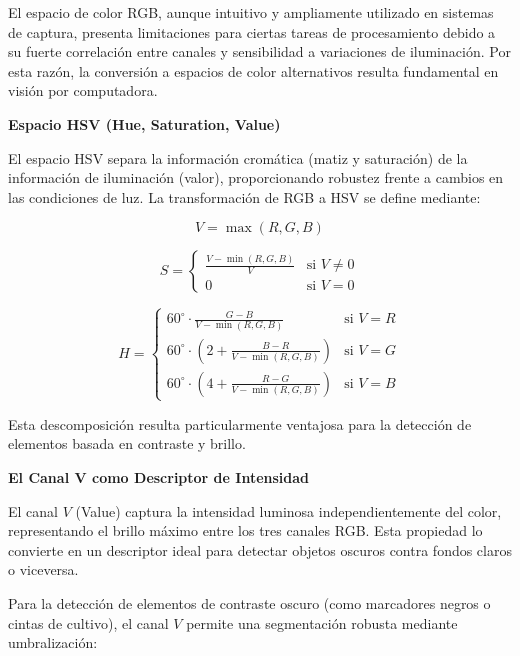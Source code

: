 El espacio de color RGB, aunque intuitivo y ampliamente utilizado en sistemas de captura, presenta limitaciones para ciertas tareas de procesamiento debido a su fuerte correlación entre canales y sensibilidad a variaciones de iluminación. Por esta razón, la conversión a espacios de color alternativos resulta fundamental en visión por computadora.

\textbf{Espacio HSV (Hue, Saturation, Value)}

El espacio HSV separa la información cromática (matiz y saturación) de la información de iluminación (valor), proporcionando robustez frente a cambios en las condiciones de luz. La transformación de RGB a HSV se define mediante:

\begin{equation}
V = \max(R, G, B)
\end{equation}

\begin{equation}
S = \begin{cases}
\frac{V - \min(R,G,B)}{V} & \text{si } V \neq 0 \\
0 & \text{si } V = 0
\end{cases}
\end{equation}

\begin{equation}
H = \begin{cases}
60^\circ \cdot \frac{G-B}{V - \min(R,G,B)} & \text{si } V = R \\
60^\circ \cdot \left(2 + \frac{B-R}{V - \min(R,G,B)}\right) & \text{si } V = G \\
60^\circ \cdot \left(4 + \frac{R-G}{V - \min(R,G,B)}\right) & \text{si } V = B
\end{cases}
\end{equation}

Esta descomposición resulta particularmente ventajosa para la detección de elementos basada en contraste y brillo.

\textbf{El Canal V como Descriptor de Intensidad}

El canal $V$ (Value) captura la intensidad luminosa independientemente del color, representando el brillo máximo entre los tres canales RGB. Esta propiedad lo convierte en un descriptor ideal para detectar objetos oscuros contra fondos claros o viceversa.

Para la detección de elementos de contraste oscuro (como marcadores negros o cintas de cultivo), el canal $V$ permite una segmentación robusta mediante umbralización:

